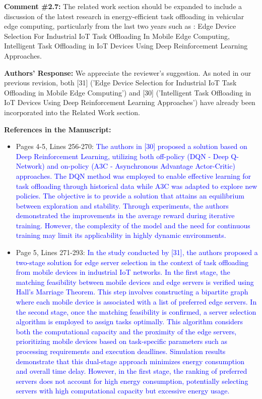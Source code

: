 \begin{mdframed}[style=review] 
\textbf{Comment \#2.7:} The related work section should be expanded to include a discussion of the latest research in energy-efficient task offloading in vehicular edge computing, particularly from the last two years such as : Edge Device Selection For Industrial IoT Task Offloading In Mobile Edge Computing, Intelligent Task Offloading in IoT Devices Using Deep Reinforcement Learning Approaches.
\end{mdframed}

\textbf{Authors' Response:} 
We appreciate the reviewer's suggestion. As noted in our previous revision, both [31] ('Edge Device Selection for Industrial IoT Task Offloading in Mobile Edge Computing') and [30] ('Intelligent Task Offloading in IoT Devices Using Deep Reinforcement Learning Approaches') have already been incorporated into the Related Work section.

\textbf{References in the Manuscript:}
\begin{itemize}
    \item Pages 4-5, Lines 256-270: \textcolor{blue}{The authors in [30] proposed a solution based on Deep Reinforcement Learning, utilizing both off-policy (DQN - Deep Q-Network) and on-policy (A3C - Asynchronous Advantage Actor-Critic) approaches. The DQN method was employed to enable effective learning for task offloading through historical data while A3C was adapted to explore new policies. The objective is to provide a solution that attains an equilibrium between exploration and stability. Through experiments, the authors demonstrated the improvements in the average reward during iterative training. However, the complexity of the model and the need for continuous training may limit its applicability in highly dynamic environments.}
    
    \item Page 5, Lines 271-293: \textcolor{blue}{In the study conducted by [31], the authors proposed a two-stage solution for edge server selection in the context of task offloading from mobile devices in industrial IoT networks. In the first stage, the matching feasibility between mobile devices and edge servers is verified using Hall's Marriage Theorem. This step involves constructing a bipartite graph where each mobile device is associated with a list of preferred edge servers. In the second stage, once the matching feasibility is confirmed, a server selection algorithm is employed to assign tasks optimally. This algorithm considers both the computational capacity and the proximity of the edge servers, prioritizing mobile devices based on task-specific parameters such as processing requirements and execution deadlines. Simulation results demonstrate that this dual-stage approach minimizes energy consumption and overall time delay. However, in the first stage, the ranking of preferred servers does not account for high energy consumption, potentially selecting servers with high computational capacity but excessive energy usage.}
\end{itemize}